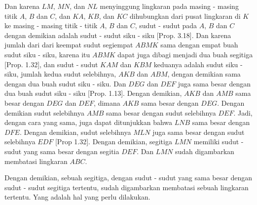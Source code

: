 \documentclass[a4paper]{book}
\begin{document}
Dan karena $LM$, $MN$, dan $NL$ menyinggung lingkaran pada masing -
masing titik $A$, $B$ dan $C$, dan $KA$, $KB$, dan $KC$ dihubungkan dari
pusat lingkaran di $K$ ke masing - masing titik - titik $A$, $B$ dan $C$, sudut - sudut pada $A$, $B$ dan $C$ dengan demikian adalah sudut - 
sudut siku - siku [Prop. 3.18]. Dan karena jumlah dari dari keempat 
sudut segiempat $ABMK$ sama dengan empat buah sudut siku - siku, karena itu $ABMK$ dapat juga dibagi menjadi dua buah segitiga [Prop. 1.32], 
dan sudut - sudut $KAM$ dan $KBM$ keduanya adalah sudut siku - siku, 
jumlah kedua sudut selebihnya, $AKB$ dan $ABM$, dengan demikian sama 
dengan dua buah sudut siku - siku. Dan $DEG$ dan $DEF$ juga sama besar
dengan dua buah sudut siku - siku [Prop. 1.13]. Dengan demikian, $AKB$
dan $AMB$ sama besar dengan $DEG$ dan $DEF$, dimana $AKB$ sama besar
dengan $DEG$. Dengan demikian sudut selebihnya $AMB$ sama besar dengan
sudut selebihnya $DEF$. Jadi, dengan cara yang sama, juga dapat 
ditunjukkan bahwa $LNB$ sama besar dengan $DFE$. Dengan demikian, sudut
selebihnya $MLN$ juga sama besar dengan sudut selebihnya $EDF$ 
[Prop 1.32]. Dengan demikian, segitiga $LMN$ memiliki sudut - sudut yang
sama besar dengan segitia $DEF$. Dan $LMN$ sudah digambarkan membatasi
lingkaran $ABC$.

Dengan demikian, sebuah segitiga, dengan sudut - sudut yang sama besar 
dengan sudut - sudut segitiga tertentu, sudah digambarkan membatasi
sebuah lingkaran tertentu. Yang adalah hal yang perlu dilakukan.

\end{document}
